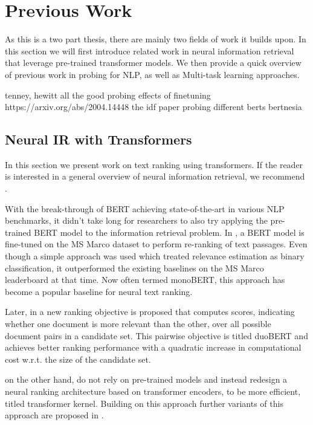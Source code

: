 \chapter{Previous Work}
\label{chap:prev}
As this is a two part thesis, there are mainly two fields of work it builds upon. In this section we will first introduce related work in neural information retrieval that leverage pre-trained transformer models. We then provide a quick overview of previous work in probing for NLP, as well as Multi-task learning approaches.

tenney, hewitt all the good probing
effects of finetuning https://arxiv.org/abs/2004.14448
the idf paper
probing different berts
bertnesia

\section{Neural IR with Transformers}
In this section we present work on text ranking using transformers. If the reader is interested in a general overview of neural information retrieval, we recommend \cite{mitra2018an, Onal2017NeuralIR, Guo2020ADL}.

With the break-through of BERT \cite{devlin-etal-2019-bert} achieving state-of-the-art in various NLP benchmarks, it didn't take long for researchers to also try applying the pre-trained BERT model to the information retrieval problem. In \cite{Nogueira2019PassageRW}, a BERT model is fine-tuned on the MS Marco dataset \cite{DBLP:journals/corr/NguyenRSGTMD16} to perform re-ranking of text passages. Even though a simple approach was used which treated relevance estimation as binary classification, it outperformed the existing baselines on the MS Marco leaderboard at that time. Now often termed monoBERT, this approach has become a popular baseline for neural text ranking.

Later, in \cite{Nogueira2019MultiStageDR} a new ranking objective is proposed that computes scores, indicating whether one document is more relevant than the other, over all possible document pairs in a candidate set. This pairwise objective is titled duoBERT and achieves better ranking performance with a quadratic increase in computational cost w.r.t. the size of the candidate set.

\cite{DBLP:journals/corr/abs-1912-01385} on the other hand, do not rely on pre-trained models and instead redesign a neural ranking architecture based on transformer encoders, to be more efficient, titled transformer kernel. Building on this approach further variants of this approach are proposed in \cite{Hofsttter2020LocalSO, 10.1145/3404835.3463049}.

